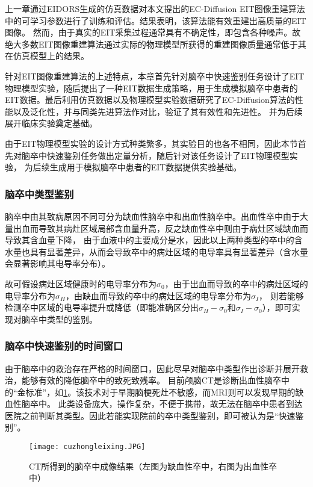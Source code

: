 

上一章通过EIDORS生成的仿真数据对本文提出的EC-Diffusion EIT图像重建算法中的可学习参数进行了训练和评估。结果表明，该算法能有效重建出高质量的EIT图像。
然而，由于真实的EIT采集过程通常具有不确定性，即包含各种噪声。故绝大多数EIT图像重建算法通过实际的物理模型所获得的重建图像质量通常低于其在仿真模型上的结果。

针对EIT图像重建算法的上述特点，本章首先针对脑卒中快速鉴别任务设计了EIT物理模型实验，随后提出了一种EIT数据生成策略，用于生成模拟脑卒中患者的EIT数据。最后利用仿真数据以及物理模型实验数据研究了EC-Diffusion算法的性能以及泛化性，并与同类先进算法作对比，验证了其有效性和先进性。
并为后续展开临床实验奠定基础。

由于EIT物理模型实验的设计方式种类繁多，其实验目的也各不相同，因此本节首先对脑卒中快速鉴别任务做出定量分析，随后针对该任务设计了EIT物理模型实验，
为后续生成用于模拟脑卒中患者的EIT数据提供实验基础。


\subsubsection{脑卒中类型鉴别}
脑卒中由其致病原因不同可分为缺血性脑卒中和出血性脑卒中。出血性卒中由于大量出血而导致其病灶区域局部含血量升高，反之缺血性卒中则由于病灶区域缺血而导致其含血量下降，
由于血液中的主要成分是水，因此以上两种类型的卒中的含水量也具有显著差异，从而会导致卒中的病灶区域的电导率具有显著差异（含水量会显著影响其电导率分布）。

故可假设病灶区域健康时的电导率分布为$\sigma_0$，由于出血而导致的卒中的病灶区域的电导率分布为$\sigma_H$，由缺血而导致的卒中的病灶区域的电导率分布为$\sigma_I$，
则若能够检测卒中区域的电导率提升或降低（即能准确区分出$\sigma_H - \sigma_0$和$\sigma_I - \sigma_0$），即可实现对脑卒中类型的鉴别。

\subsubsection{脑卒中快速鉴别的时间窗口}
由于脑卒中的救治存在严格的时间窗口，因此尽早对脑卒中类型作出诊断并展开救治，能够有效的降低脑卒中的致死致残率。
目前颅脑CT是诊断出血性脑卒中的“金标准”，如\cref{figure:cuzhongleixing}。该技术对于早期脑梗死灶不敏感，而MRI则可以发现早期的缺血性脑卒中。
此类设备庞大，操作复杂，不便于携带，故无法在脑卒中患者到达医院之前判断其类型。因此若能实现院前的卒中类型鉴别，即可被认为是“快速鉴别”。
\begin{figure}[h]
    \centering
    \texttt{[image: cuzhongleixing.JPG]}
    \caption{CT所得到的脑卒中成像结果（左图为缺血性卒中，右图为出血性卒中）\cite{5335289}}
    \label{figure:cuzhongleixing}
\end{figure}

